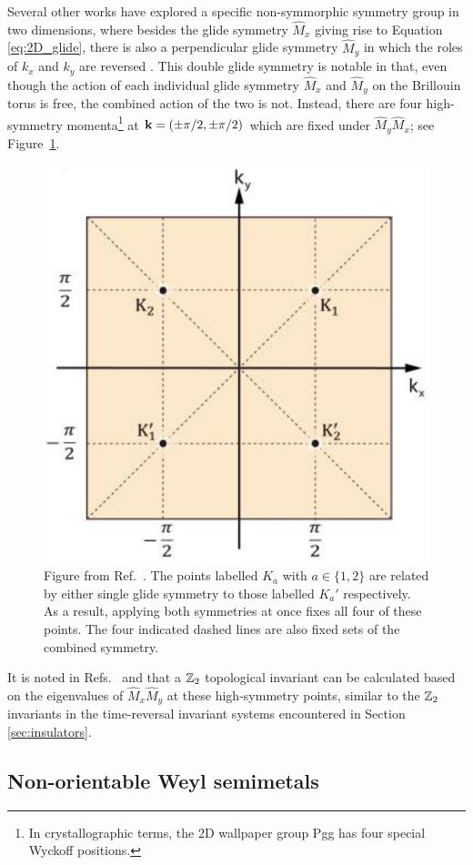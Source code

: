 Several other works have explored a specific non-symmorphic symmetry group in two dimensions, where besides the glide symmetry $\hat{M}_x$ giving rise to Equation \eqref{eq:2D_glide}, there is also a perpendicular glide symmetry $\hat{M}_y$ in which the roles of $k_x$ and $k_y$ are reversed \cite{HZY_RP2,WangZhang_acoustic-Klein-2D,Tao_quadrupole}. This double glide symmetry is notable in that, even though the action of each individual glide symmetry $\hat{M}_x$ and $\hat{M}_y$ on the Brillouin torus is free, the combined action of the two is not. Instead, there are four high-symmetry momenta\footnote{
	In crystallographic terms, the 2D wallpaper group Pgg has four special Wyckoff positions.}
at $\vb{k} = (\pm\pi/2,\pm\pi/2)$ which are fixed under $\hat{M}_y\hat{M}_x$; see Figure~\ref{fig:Pgg-fixed-points}.
\begin{figure}[htb!]
	\centering
	\includegraphics[width=.5\linewidth]{Images/Pgg-fixed-points}
	\caption{Figure from Ref.~\cite{WangZhang_acoustic-Klein-2D}. The points labelled $K_a$ with $a\in\{1,2\}$ are related by either single glide symmetry to those labelled $K_a'$ respectively. As a result, applying both symmetries at once fixes all four of these points. The four indicated dashed lines are also fixed sets of the combined symmetry.} %
	\label{fig:Pgg-fixed-points}
\end{figure}
It is noted in Refs.~\cite{HZY_RP2} and \cite{WangZhang_acoustic-Klein-2D} that a $\mathbb{Z}_2$ topological invariant can be calculated based on the eigenvalues of $\hat{M}_x\hat{M}_y$ at these high-symmetry points, similar to the $\mathbb{Z}_2$ invariants in the time-reversal invariant systems encountered in Section \ref{sec:insulators}.

\subsection{Non-orientable Weyl semimetals}


